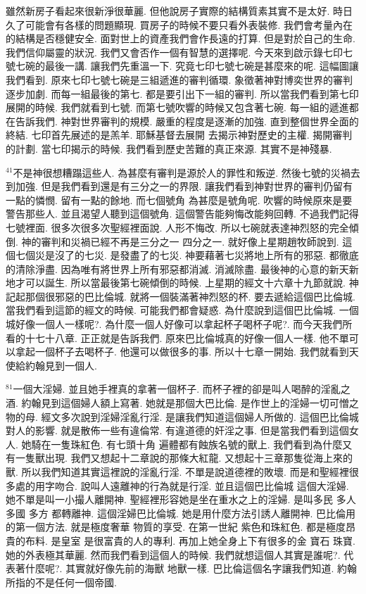 \documentclass{book}
\begin{document}
雖然新房子看起來很新淨很華麗.
但他說房子實際的結構質素其實不是太好.
時日久了可能會有各樣的問題顯現.
買房子的時候不要只看外表裝修.
我們會考量內在的結構是否穩健安全.
面對世上的資產我們會作長遠的打算.
但是對於自己的生命.
我們信仰屬靈的狀況.
我們又會否作一個有智慧的選擇呢.
今天來到啟示錄七印七號七碗的最後一講.
讓我們先重溫一下.
究竟七印七號七碗是甚麼來的呢.
這幅圖讓我們看到.
原來七印七號七碗是三組遞進的審判循環.
象徵著神對博奕世界的審判逐步加劇.
而每一組最後的第七.
都是要引出下一組的審判.
所以當我們看到第七印展開的時候.
我們就看到七號.
而第七號吹響的時候又包含著七碗.
每一組的遞進都在告訴我們.
神對世界審判的規模.
嚴重的程度是逐漸的加強.
直到整個世界全面的終結.
七印首先展述的是羔羊.
耶穌基督去展開 去揭示神對歷史的主權.
揭開審判的計劃.
當七印揭示的時候.
我們看到歷史苦難的真正來源.
其實不是神殘暴.

$^{41}$不是神很想糟蹋這些人.
為甚麼有審判是源於人的罪性和叛逆.
然後七號的災禍去到加強.
但是我們看到還是有三分之一的界限.
讓我們看到神對世界的審判仍留有一點的憐憫.
留有一點的餘地.
而七個號角 為甚麼是號角呢.
吹響的時候原來是要警告那些人.
並且渴望人聽到這個號角.
這個警告能夠悔改能夠回轉.
不過我們記得七號裡面.
很多次很多次聖經裡面說.
人形不悔改.
所以七碗就表達神烈怒的完全傾倒.
神的審判和災禍已經不再是三分之一 四分之一.
就好像上星期趙牧師說到.
這個七個災是沒了的七災.
是發盡了的七災.
神要藉著七災將地上所有的邪惡.
都徹底的清除淨盡.
因為唯有將世界上所有邪惡都消滅.
消滅除盡.
最後神的心意的新天新地才可以誕生.
所以當最後第七碗傾倒的時候.
上星期的經文十六章十九節就說.
神記起那個很邪惡的巴比倫城.
就將一個裝滿著神烈怒的杯.
要去遞給這個巴比倫城.
當我們看到這節的經文的時候.
可能我們都會疑惑.
為什麼說到這個巴比倫城.
一個城好像一個人一樣呢?.
為什麼一個人好像可以拿起杯子喝杯子呢?.
而今天我們所看的十七十八章.
正正就是告訴我們.
原來巴比倫城真的好像一個人一樣.
他不單可以拿起一個杯子去喝杯子.
他還可以做很多的事.
所以十七章一開始.
我們就看到天使給約翰見到一個人.

$^{81}$一個大淫婦.
並且她手裡真的拿著一個杯子.
而杯子裡的卻是叫人喝醉的淫亂之酒.
約翰見到這個婦人額上寫著.
她就是那個大巴比倫.
是作世上的淫婦一切可憎之物的母.
經文多次說到淫婦淫亂行淫.
是讓我們知道這個婦人所做的.
這個巴比倫城對人的影響.
就是散佈一些有違倫常.
有違道德的奸淫之事.
但是當我們看到這個女人.
她騎在一隻珠紅色.
有七頭十角 遍體都有蝕族名號的獸上.
我們看到為什麼又有一隻獸出現.
我們又想起十二章說的那條大紅龍.
又想起十三章那隻從海上來的獸.
所以我們知道其實這裡說的淫亂行淫.
不單是說道德裡的敗壞.
而是和聖經裡很多處的用字吻合.
說叫人遠離神的行為就是行淫.
並且這個巴比倫城 這個大淫婦.
她不單是叫一小撮人離開神.
聖經裡形容她是坐在重水之上的淫婦.
是叫多民 多人 多國 多方 都轉離神.
這個淫婦巴比倫城.
她是用什麼方法引誘人離開神.
巴比倫用的第一個方法.
就是極度奢華 物質的享受.
在第一世紀 紫色和珠紅色.
都是極度昂貴的布料.
是皇室 是很富貴的人的專利.
再加上她全身上下有很多的金 寶石 珠寶.
她的外表極其華麗.
然而我們看到這個人的時候.
我們就想這個人其實是誰呢?.
代表著什麼呢?.
其實就好像先前的海獸 地獸一樣.
巴比倫這個名字讓我們知道.
約翰所指的不是任何一個帝國.
\end{document}

